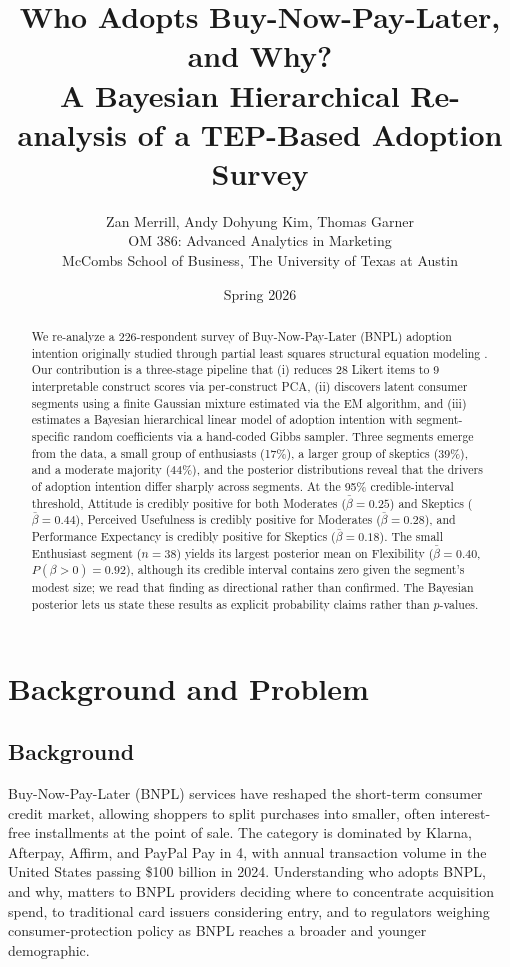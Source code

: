 \documentclass[11pt]{article}
\title{\vspace{-1.2cm}%
  {\Large Who Adopts Buy-Now-Pay-Later, and Why?}\\[6pt]
  {\normalsize A Bayesian Hierarchical Re-analysis of a TEP-Based Adoption Survey}%
}
\author{%
  Zan Merrill, Andy Dohyung Kim, Thomas Garner \\[4pt]
  \small OM 386: Advanced Analytics in Marketing \\
  \small McCombs School of Business, The University of Texas at Austin%
}
\date{Spring 2026}
\begin{document}
\maketitle

\begin{abstract}
\noindent We re-analyze a 226-respondent survey of Buy-Now-Pay-Later (BNPL) adoption
intention originally studied through partial least squares structural
equation modeling \citep{dadra2024tep}. Our contribution is a three-stage
pipeline that (i) reduces 28 Likert items to 9 interpretable construct
scores via per-construct PCA, (ii) discovers latent consumer segments
using a finite Gaussian mixture estimated via the EM algorithm, and
(iii) estimates a Bayesian hierarchical linear model of adoption intention
with segment-specific random coefficients via a hand-coded Gibbs sampler.
Three segments emerge from the data, a small group of enthusiasts (17\%),
a larger group of skeptics (39\%), and a moderate majority (44\%), and
the posterior distributions reveal that the drivers of adoption
intention differ sharply across segments. At the 95\% credible-interval
threshold, Attitude is credibly positive for both Moderates
($\bar{\beta} = 0.25$) and Skeptics ($\bar{\beta} = 0.44$),
Perceived Usefulness is credibly positive for Moderates
($\bar{\beta} = 0.28$), and Performance Expectancy is credibly
positive for Skeptics ($\bar{\beta} = 0.18$). The small Enthusiast segment ($n = 38$) yields
its largest posterior mean on Flexibility ($\bar{\beta} = 0.40$,
$P(\beta > 0) = 0.92$), although its credible interval contains zero
given the segment's modest size; we read that finding as directional
rather than confirmed. The Bayesian posterior lets us state these
results as explicit probability claims rather than $p$-values.
\end{abstract}

\section{Background and Problem}

\subsection{Background}

Buy-Now-Pay-Later (BNPL) services have reshaped the short-term consumer
credit market, allowing shoppers to split purchases into smaller, often
interest-free installments at the point of sale. The category is dominated
by Klarna, Afterpay, Affirm, and PayPal Pay in 4, with annual transaction
volume in the United States passing \$100 billion in 2024. Understanding
who adopts BNPL, and why, matters to BNPL providers deciding where to
concentrate acquisition spend, to traditional card issuers considering
entry, and to regulators weighing consumer-protection policy as BNPL
reaches a broader and younger demographic.
\end{document}
